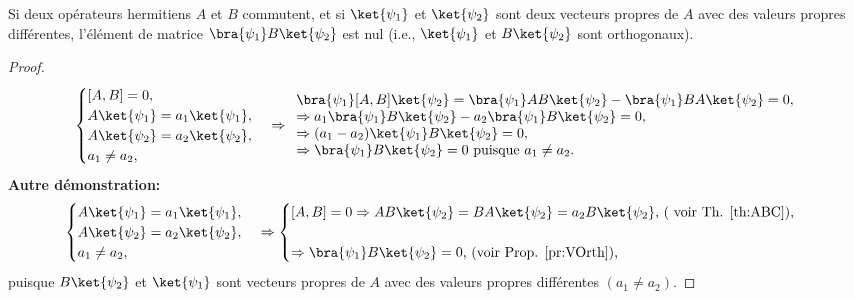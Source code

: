 \colorbox[gray]{0.8}{
\parbox[c]{0.9\textwidth}{
\begin{theorem}
\label{th:OpABHerm}Si deux opérateurs hermitiens $A$ et $B$ commutent, et si
$\ket{\psi_1}$ et $\ket{\psi_{2}}$ sont deux vecteurs propres de $A$ avec
des valeurs propres différentes, l'élément de matrice $\bra{\psi_1}B
\ket{\psi_{2}}$ est nul (i.e., $\ket{\psi_1}$ et $B\ket{\psi_{2}}$
sont orthogonaux).
\end{theorem}
}}\medskip

\begin{proof}
\begin{equation}
\begin{cases}
[A,B]=0,\\
A\ket{\psi_1} =a_1\ket{\psi_1} ,\\
A\ket{\psi_{2}} =a_{2}\ket{\psi_{2}} ,\\
a_1\neq a_{2},
\end{cases}  \Rightarrow%
\begin{array}
[c]{l}%
\bra{\psi_1}[A,B]\ket{\psi_{2}}=\bra{\psi_1}AB\ket{\psi_{2}}
-\bra{\psi_1}BA\ket{\psi_{2}} =0,\\
\Rightarrow
a_1\bra{\psi_1}B\ket{\psi_{2}}-a_{2}\bra{\psi_1}B\ket{\psi_{2}} =0,\\
\Rightarrow(a_1-a_{2})\ket{\psi_1}B\ket{\psi_{2}} =0,\\
\Rightarrow\bra{\psi_1}B\ket{\psi_{2}}=0\text{ puisque }a_1\neq a_{2}.
\end{array}
\end{equation}
\textbf{Autre démonstration:}%
\begin{equation}
\begin{cases}
A\ket{\psi_1} =a_1\ket{\psi_1} ,\\
A\ket{\psi_{2}} =a_{2}\ket{\psi_{2}} ,\\
a_1\neq a_{2},
\end{cases}  \Rightarrow\begin{cases}
[A,B]  =0\Rightarrow AB\ket{\psi_{2}}
=BA\ket{\psi_{2}} =a_{2}B\ket{\psi_{2}}
\text{, ( voir Th. \ref{th:ABC}),}\\
\\
\Rightarrow\bra{\psi_1}B\ket{\psi_{2}}
=0\text{, (voir Prop. \ref{pr:VOrth}),}%
\end{cases}
\end{equation}
puisque $B\ket{\psi_{2}} $ et $\ket{\psi_1}$ sont vecteurs propres de $A$ avec
des valeurs propres différentes $(a_1\neq a_{2})$.
\end{proof}

